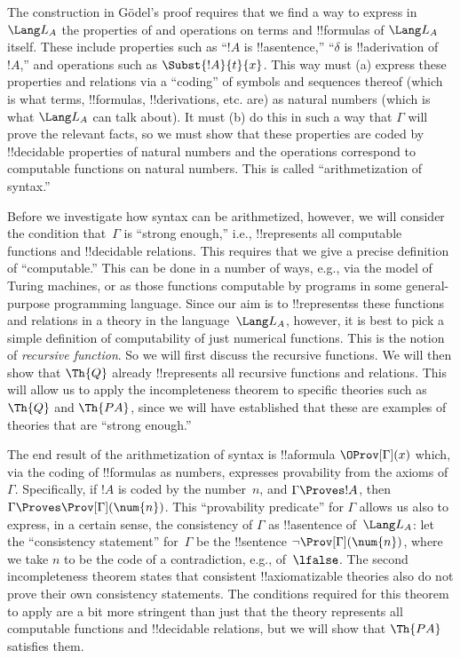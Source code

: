 \documentclass[../../../include/open-logic-section]{subfiles}
\begin{document}
The construction in G\"odel's proof requires that we find a way to
express in $\Lang L_A$ the properties of and operations on terms and
!!{formula}s of $\Lang L_A$ itself. These include properties such as
``$!A$ is !!a{sentence},'' ``$\delta$ is !!a{derivation} of~$!A$,''
and operations such as $\Subst{!A}{t}{x}$.  This way must (a) express
these properties and relations via a ``coding'' of symbols and
sequences thereof (which is what terms, !!{formula}s, !!{derivation}s,
etc. are) as natural numbers (which is what $\Lang L_A$ can talk
about). It must (b) do this in such a way that $\Gamma$ will prove the
relevant facts, so we must show that these properties are coded by
!!{decidable} properties of natural numbers and the operations
correspond to computable functions on natural numbers. This is called
``arithmetization of syntax.''

Before we investigate how syntax can be arithmetized, however, we will
consider the condition that~$\Gamma$ is ``strong enough,'' i.e.,
!!{represents} all computable functions and !!{decidable} relations.
This requires that we give a precise definition of ``computable.''
This can be done in a number of ways, e.g., via the model of Turing
machines, or as those functions computable by programs in some
general-purpose programming language.  Since our aim is to
!!{represents}s these functions and relations in a theory in the
language~$\Lang L_A$, however, it is best to pick a simple definition
of computability of just numerical functions.  This is the notion of
\emph{recursive function}.  So we will first discuss the recursive
functions. We will then show that $\Th{Q}$ already !!{represents} all
recursive functions and relations.  This will allow us to apply the
incompleteness theorem to specific theories such as $\Th{Q}$ and
$\Th{PA}$, since we will have established that these are examples of
theories that are ``strong enough.''

The end result of the arithmetization of syntax is
!!a{formula} $\OProv[\Gamma](x)$ which, via the coding of !!{formula}s
as numbers, expresses provability from the axioms of~$\Gamma$.
Specifically, if $!A$ is coded by the number~$n$, and $\Gamma \Proves
!A$, then $\Gamma \Proves \Prov[\Gamma](\num{n})$.  This ``provability
predicate'' for $\Gamma$ allows us also to express, in a certain
sense, the consistency of $\Gamma$ as !!a{sentence} of~$\Lang L_A$:
let the ``consistency statement'' for~$\Gamma$ be the !!{sentence}
$\lnot \Prov[\Gamma](\num{n})$, where we take $n$ to be the code of a
contradiction, e.g., of~$\lfalse$.  The second incompleteness theorem
states that consistent !!{axiomatizable} theories also do not prove
their own consistency statements.  The conditions required for this
theorem to apply are a bit more stringent than just that the theory
represents all computable functions and !!{decidable} relations, but
we will show that $\Th{PA}$ satisfies them.
\end{document}
